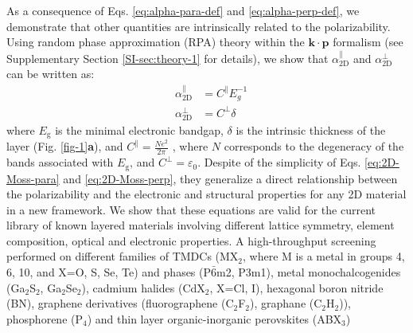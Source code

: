 \documentclass[journal=ancac3,manuscript=article,email=true,hyperref=true,keywords=false]{achemso}
\begin{document}


As a consequence of Eqs. \ref{eq:alpha-para-def} and
\ref{eq:alpha-perp-def}, we demonstrate that other quantities are
intrinsically related to the polarizability.  Using random phase
approximation (RPA) theory \cite{Adler_1962} within the
$\mathbf{k} \cdot \mathbf{p}$ formalism\cite{kittel_2005_introduction}
(see Supplementary Section \ref{SI-sec:theory-1} for details), we show
that $\alpha_{\mathrm{2D}}^{\parallel}$ and
$\alpha_{\mathrm{2D}}^{\perp}$ can be written as:
\begin{subequations}
\begin{eqnarray}
\label{eq:2D-Moss-para}
  &\alpha_{\mathrm{2D}}^{\parallel} &=C^{\parallel} E_{g}^{-1} \\
  \label{eq:2D-Moss-perp}
  &\alpha_{\mathrm{2D}}^{\perp} & =C^{\perp} \delta
\end{eqnarray}
\end{subequations}
where $E_{\mathrm{g}}$ is the minimal electronic bandgap, $\delta$ is
the intrinsic thickness of the layer (Fig. \ref{fig-1}{\textbf a}), and
$C^{\parallel} = {\displaystyle \frac{Ne^2}{2 \pi}}$ \cite{Jiang_2017_Eg_Eb}, where
$N$ corresponds to the degeneracy of the bands associated with
$E_{\mathrm{g}}$, and $C^{\perp} = {\varepsilon_{0}}$.
Despite of the simplicity of Eqs. \ref{eq:2D-Moss-para} and
\ref{eq:2D-Moss-perp}, they generalize a direct relationship between
the polarizability and the electronic and structural properties for
any 2D material in a new framework.  We show that these equations are
valid for the current library of known layered materials involving
different lattice symmetry, element composition, optical and
electronic properties.
%
A high-throughput screening performed on different families of TMDCs
(MX\(_{\text{2}}\), where M is a metal in groups 4, 6, 10, and X=O, S,
Se, Te) and phases (P\(\bar{6}\)m2, P3m1), metal monochalcogenides
(Ga$_{2}$S$_{2}$, Ga$_{2}$Se$_{2}$), cadmium halides (CdX$_2$, X=Cl,
I), hexagonal boron nitride (BN), graphene derivatives (fluorographene
(C$_{2}$F$_{2}$), graphane (C$_{2}$H$_{2}$)), phosphorene (P$_{4}$)
and thin layer organic-inorganic perovskites (ABX$_{3}$)
\end{document}

